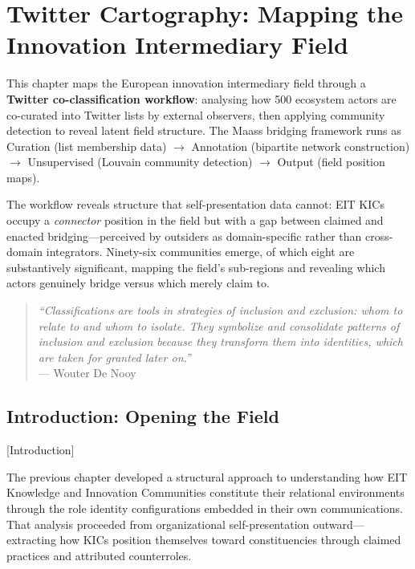 \documentclass[../main.tex]{subfiles}
\begin{document}
\chapter{Twitter Cartography: Mapping the Innovation Intermediary Field}
\margintoc

\begin{chapteroverview}
This chapter maps the European innovation intermediary field through a \textbf{Twitter co-classification workflow}: analysing how 500 ecosystem actors are co-curated into Twitter lists by external observers, then applying community detection to reveal latent field structure. The Maass bridging framework runs as Curation (list membership data) $\rightarrow$ Annotation (bipartite network construction) $\rightarrow$ Unsupervised (Louvain community detection) $\rightarrow$ Output (field position maps).

The workflow reveals structure that self-presentation data cannot: EIT KICs occupy a \emph{connector} position in the field but with a gap between claimed and enacted bridging---perceived by outsiders as domain-specific rather than cross-domain integrators. Ninety-six communities emerge, of which eight are substantively significant, mapping the field's sub-regions and revealing which actors genuinely bridge versus which merely claim to.
\end{chapteroverview}

\begin{quote}
\textit{``Classifications are tools in strategies of inclusion and exclusion: whom to relate to and whom to isolate. They symbolize and consolidate patterns of inclusion and exclusion because they transform them into identities, which are taken for granted later on.''}\\
--- Wouter De Nooy \cite{denooy2003fields}
\end{quote}


\section{Introduction: Opening the Field}[Introduction]

The previous chapter developed a structural approach to understanding how EIT Knowledge and Innovation Communities constitute their relational environments through the role identity configurations embedded in their own communications. That analysis proceeded from organizational self-presentation outward---extracting how KICs position themselves toward constituencies through claimed practices and attributed counterroles.
\end{document}
